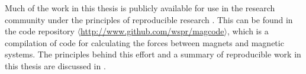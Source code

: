 \documentclass[11pt,a4paper]{memoir}
\begin{document}
\begin{itemize}
\end{itemize}

\noindent Much of the work in this thesis is publicly available for use in the research community under the principles of reproducible research \parencite{kovacevic2007-icassp}.
This can be found in the code repository $\langle$\url{http://www.github.com/wspr/magcode}$\rangle$, which is a compilation of code for calculating the forces between magnets and magnetic systems.
The principles behind this effort and a summary of reproducible work in this thesis are discussed in .
\end{document}
